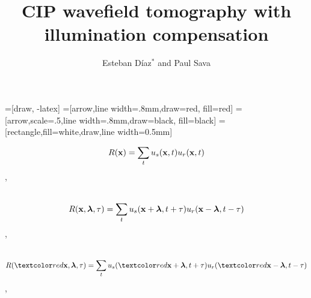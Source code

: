 


\huge
{}
\linethickness{0.2mm}

\title[]{CIP wavefield tomography with illumination compensation }
\author[]{Esteban  D\'{i}az$^{*}$ and Paul Sava}
\date{}
\logo{}


\def\big#1{\begin{center} \LARGE \textbf{#1} \end{center}}
\def\cen#1{\begin{center}        \textbf{#1} \end{center}}

=[draw, -latex] 
=[arrow,line width=.8mm,draw=red, fill=red]
=[arrow,scale=.5,line width=.8mm,draw=black, fill=black]
=[rectangle,fill=white,draw,line width=0.5mm]

 { \cwpcover }


\begin{frame}
  
\end{frame}



\begin{frame}
  \[
     R({\bf x}) =
     \sum_{t} u_s({\bf x},t) u_r({\bf x},t)
  \]
\sep  
   \\ 
  \\
\end{frame}


\begin{frame}
  \[
     R({\bf x},{\boldsymbol{\lambda}},\tau) =
     \sum_{t} u_s({\bf x}+{\boldsymbol{\lambda}},t+\tau) u_r({\bf x}-{\boldsymbol{\lambda}},t-\tau)
  \]
\sep  
   \\ 
  \\
\end{frame}

\begin{frame}
  \[
     R(\red{\xx},\hh,\tau) =
     \sum_{t} u_s(\red{\xx}+\hh,t+\tau) u_r(\red{\xx}-\hh,t-\tau)
  \]
\sep  
   \\ 
  \\

\end{frame}

